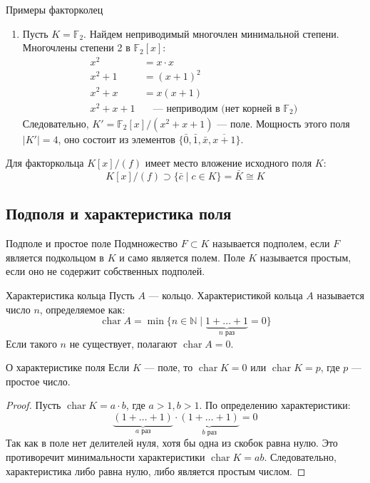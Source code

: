 \begin{Example}{Примеры факторколец}{}
\begin{enumerate}
\begin{enumerate}
			\item[(e)] Пусть $K = \mathbb{F}_2$. Найдем неприводимый многочлен минимальной степени. Многочлены степени 2 в $\mathbb{F}_2[x]$:
			\begin{align*}
				x^2 &= x \cdot x \\
				x^2 + 1 &= (x + 1)^2 \\
				x^2 + x &= x(x + 1) \\
				x^2 + x + 1 & \quad \text{--- неприводим (нет корней в } \mathbb{F}_2 \text{)}
			\end{align*}
			Следовательно, $K' = \mathbb{F}_2[x]/(x^2 + x + 1)$ --- поле. Мощность этого поля $|K'| = 4$, оно состоит из элементов $\{\bar{0}, \bar{1}, \bar{x}, \overline{x+1}\}$.
		\end{enumerate}
	\end{enumerate}
\end{Example}

\begin{Remark}{}{}
	Для факторкольца $K[x]/(f)$ имеет место вложение исходного поля $K$:
	\[ K[x]/(f) \supset \{\bar{c} \mid c \in K\} = \bar{K} \cong K \]
\end{Remark}

\subsection{Подполя и характеристика поля}

\begin{Definition}{Подполе и простое поле}{}
	Подмножество $F \subset K$ называется подполем, если $F$ является подкольцом в $K$ и само является полем.
	Поле $K$ называется простым, если оно не содержит собственных подполей.
\end{Definition}

\begin{Definition}{Характеристика кольца}{}
	Пусть $A$ --- кольцо. Характеристикой кольца $A$ называется число $n$, определяемое как:
	\[ \operatorname{char} A = \min \{n \in \mathbb{N} \mid \underbrace{1 + \dots + 1}_{n \text{ раз}} = 0\} \]
	Если такого $n$ не существует, полагают $\operatorname{char} A = 0$.
\end{Definition}

\begin{Lemma}{О характеристике поля}{}
	Если $K$ --- поле, то $\operatorname{char} K = 0$ или $\operatorname{char} K = p$, где $p$ --- простое число.
\end{Lemma}

\begin{proof}
	Пусть $\operatorname{char} K = a \cdot b$, где $a > 1, b > 1$. По определению характеристики:
	\[ \underbrace{(1 + \dots + 1)}_{a \text{ раз}} \cdot \underbrace{(1 + \dots + 1)}_{b \text{ раз}} = 0 \]
	Так как в поле нет делителей нуля, хотя бы одна из скобок равна нулю. Это противоречит минимальности характеристики $\operatorname{char} K = ab$. Следовательно, характеристика либо равна нулю, либо является простым числом.
\end{proof}

